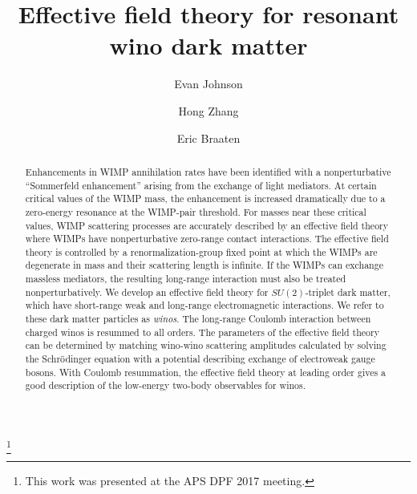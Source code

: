 \documentclass[%
 reprint,
 amsmath,amssymb,
 aps,
]{revtex4-1}
\begin{document}

\title{Effective field theory for resonant wino dark matter}
\thanks{This work was presented at the APS DPF 2017 meeting.}%
\author{Evan Johnson}

\author{Hong Zhang}

\author{Eric Braaten}

%




\begin{abstract}
Enhancements in WIMP annihilation rates have been identified with a nonperturbative ``Sommerfeld enhancement'' arising from the exchange of light mediators.
At certain critical values of the WIMP mass, the enhancement is increased dramatically due to a zero-energy resonance at the WIMP-pair threshold.
For masses near these critical values, WIMP scattering processes are accurately described by an effective field theory where WIMPs have nonperturbative zero-range contact interactions.
The effective field theory is controlled by a renormalization-group fixed point at which the WIMPs are degenerate in mass and their scattering length is infinite.
If the WIMPs can exchange massless mediators, the resulting long-range interaction must also be treated nonperturbatively.
We develop an effective field theory for $SU(2)$-triplet dark matter, which have short-range weak and long-range electromagnetic interactions.
We refer to these dark matter particles as {\it winos}.
The long-range Coulomb interaction between charged winos is resummed to all orders. 
The parameters of the effective field theory can be determined by matching wino-wino scattering amplitudes calculated by solving the Schr\"odinger equation with a potential describing exchange of  electroweak gauge bosons.
With Coulomb resummation, the effective field theory at leading order gives a good description of the low-energy two-body observables for winos.
\end{abstract}
\end{document}

